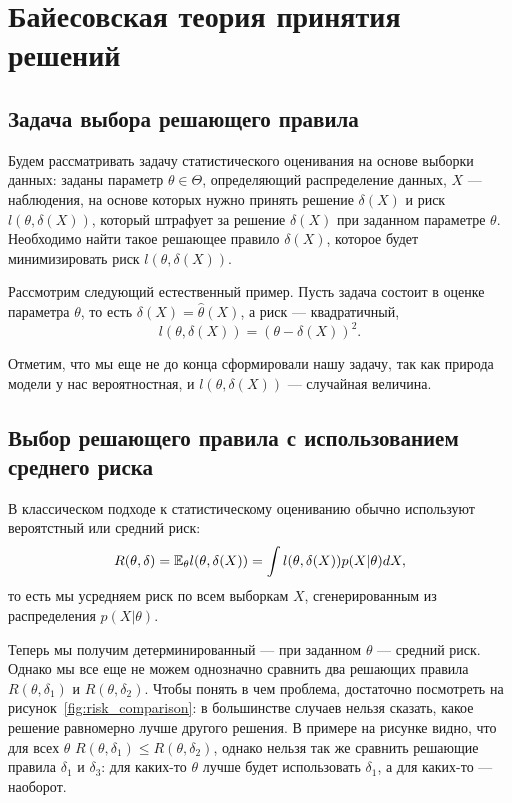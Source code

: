 \section{Байесовская теория принятия решений}

\subsection{Задача выбора решающего правила}

Будем рассматривать задачу статистического оценивания на основе выборки данных: заданы
параметр $\theta \in \Theta$, определяющий распределение данных, 
$X$ --- наблюдения, на основе которых нужно принять решение $\delta(X)$
и риск $l(\theta, \delta(X))$, который штрафует
за решение $\delta(X)$ при заданном параметре $\theta$.
Необходимо найти такое решающее правило $\delta(X)$,
которое будет минимизировать риск $l(\theta, \delta(X))$.

\begin{example}
Рассмотрим следующий естественный пример.
Пусть задача состоит в оценке параметра $\theta$, то есть
$\delta(X) = \hat{\theta}(X)$, а риск --- квадратичный,
\[
l(\theta, \delta(X)) = (\theta - \delta(X))^2.
\]
\end{example}

Отметим, что мы еще не до конца сформировали нашу задачу, 
так как природа модели у нас вероятностная,
и $l(\theta, \delta(X))$ --- случайная величина.

\subsection{Выбор решающего правила с использованием среднего риска}

В классическом подходе к статистическому оцениванию обычно 
используют вероятстный или средний риск:
\[
R(\theta, \delta) = \mathbb{E}_{\theta} l(\theta, \delta(X)) 
= \int l(\theta, \delta(X)) p(X| \theta) dX,
\]
то есть мы усредняем риск по всем выборкам $X$, сгенерированным из распределения $p(X| \theta)$.

Теперь мы получим детерминированный --- при заданном $\theta$ --- 
средний риск.
Однако мы все еще не можем однозначно сравнить два решающих правила
$R(\theta, \delta_1)$ и $R(\theta, \delta_2)$.
Чтобы понять в чем проблема, достаточно посмотреть на рисунок~\ref{fig:risk_comparison}: в большинстве случаев нельзя сказать, какое решение равномерно лучше другого решения.
В примере на рисунке видно, что для всех $\theta$ $R(\theta, \delta_1) \leq R(\theta, \delta_2)$, однако нельзя так же сравнить решающие правила 
$\delta_1$ и $\delta_3$: для каких-то $\theta$ лучше будет использовать 
$\delta_1$, а для каких-то --- наоборот.

